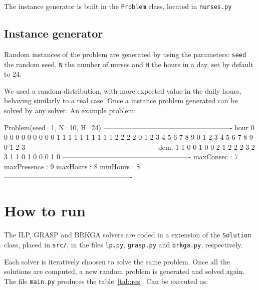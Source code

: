 \documentclass[12pt,a4paper]{article}
\begin{document}
The instance generator is built in the \texttt{Problem} class, located in 
\texttt{nurses.py}

\subsection{Instance generator}

Random instances of the problem are generated by using the parameters: 
\texttt{seed} the random seed, \texttt{N} the number of nurses and \texttt{H} 
the hours in a day, set by default to 24.

We used a random distribution, with more expected value in the daily hours, 
behaving similarly to a real case. Once a instance problem generated can be 
solved by any solver. An example problem:

\begin{textcode}
Problem(seed=1, N=10, H=24)
-------------------------------------------------------
hour  0 0 0 0 0 0 0 0 0 0 1 1 1 1 1 1 1 1 1 1 2 2 2 2 
      0 1 2 3 4 5 6 7 8 9 0 1 2 3 4 5 6 7 8 9 0 1 2 3 
-------------------------------------------------------
dem.  1 1 0 0 1 0 0 2 1 2 2 2 3 2 3 1 1 0 1 0 0 0 1 0 
-------------------------------------------------------
 maxConsec   : 7
 maxPresence : 9
 maxHours    : 8
 minHours    : 8
-------------------------------------------------------
\end{textcode}



\section{How to run}
The ILP, GRASP and BRKGA solvers are coded in a extension of the 
\texttt{Solution} class, placed in \texttt{src/}, in the files \texttt{lp.py}, 
\texttt{grasp.py} and \texttt{brkga.py}, respectively.

Each solver is iteratively choosen to solve the same problem. Once all the 
solutions are computed, a new random problem is generated and solved again. The 
file \texttt{main.py} produces the table~\ref{tab:res}. Can be executed as:
%
\begin{textcode}
\end{textcode}
\end{document}

